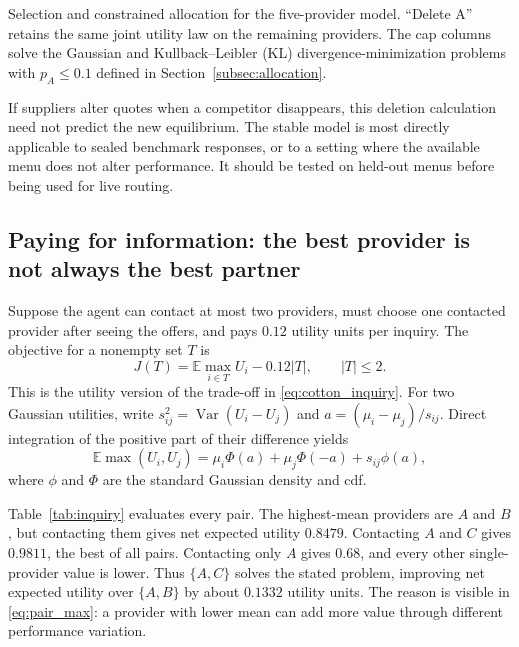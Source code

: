 \documentclass[11pt]{amsart}
\newcommand{\E}{\mathbb E}
\theoremstyle{definition}
\begin{document}
\begin{table}[ht]
\centering
\caption{Selection and constrained allocation for the five-provider model. ``Delete A'' retains the same joint utility law on the remaining providers. The cap columns solve the Gaussian and Kullback--Leibler (KL) divergence-minimization problems with $p_A\leq0.1$ defined in Section~\ref{subsec:allocation}.}\label{tab:providers}
\begin{adjustbox}{max width=\textwidth}\end{adjustbox}
\end{table}

If suppliers alter quotes when a competitor disappears, this deletion calculation need not predict the new equilibrium. The stable model is most directly applicable to sealed benchmark responses, or to a setting where the available menu does not alter performance. It should be tested on held-out menus before being used for live routing.

\subsection{Paying for information: the best provider is not always the best partner}
Suppose the agent can contact at most two providers, must choose one contacted provider after seeing the offers, and pays $0.12$ utility units per inquiry. The objective for a nonempty set $T$ is
\begin{equation}\label{eq:inquiry}
 J(T)=\E\max_{i\in T}U_i-0.12|T|,\qquad |T|\leq2.
\end{equation}
This is the utility version of the trade-off in \eqref{eq:cotton_inquiry}. For two Gaussian utilities, write
$s_{ij}^2=\operatorname{Var}(U_i-U_j)$ and $a=(\mu_i-\mu_j)/s_{ij}$. Direct integration of the positive part of their difference yields
\begin{equation}\label{eq:pair_max}
 \E\max(U_i,U_j)=\mu_i\Phi(a)+\mu_j\Phi(-a)+s_{ij}\phi(a),
\end{equation}
where $\phi$ and $\Phi$ are the standard Gaussian density and cdf.

Table~\ref{tab:inquiry} evaluates every pair. The highest-mean providers are $A$ and $B$, but contacting them gives net expected utility $0.8479$. Contacting $A$ and $C$ gives $0.9811$, the best of all pairs. Contacting only $A$ gives $0.68$, and every other single-provider value is lower. Thus $\{A,C\}$ solves the stated problem, improving net expected utility over $\{A,B\}$ by about $0.1332$ utility units. The reason is visible in \eqref{eq:pair_max}: a provider with lower mean can add more value through different performance variation.
\end{document}
